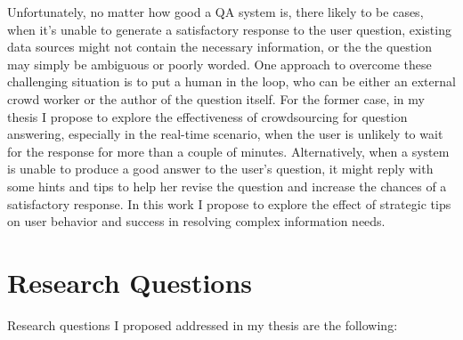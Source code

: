 Unfortunately, no matter how good a QA system is, there likely to be cases, when it's unable to generate a satisfactory response to the user question, \eg existing data sources might not contain the necessary information, or the the question may simply be ambiguous or poorly worded.
One approach to overcome these challenging situation is to put a human in the loop, who can be either an external crowd worker or the author of the question itself.
For the former case, in my thesis I propose to explore the effectiveness of crowdsourcing for question answering, especially in the real-time scenario, when the user is unlikely to wait for the response for more than a couple of minutes.
Alternatively, when a system is unable to produce a good answer to the user's question, it might reply with some hints and tips to help her revise the question and increase the chances of a satisfactory response.
In this work I propose to explore the effect of strategic tips on user behavior and success in resolving complex information needs.


\section{Research Questions}

Research questions I proposed addressed in my thesis are the following:


